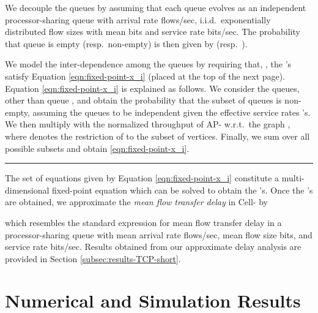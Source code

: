 \documentclass[10pt,a4paper,journal]{IEEEtran}
\theoremstyle{definition}
\theoremstyle{remark}
\theoremstyle{plain}
\begin{document}
We decouple the queues by assuming that each queue  evolves as an independent processor-sharing queue with arrival rate  flows/sec, i.i.d.~exponentially distributed flow sizes with mean  bits and service rate  bits/sec. The probability that queue  is empty (resp.~non-empty) is then given by  (resp.~).

We model the inter-dependence among the queues by requiring that, , the 's satisfy Equation \eqref{eqn:fixed-point-x_i} (placed at the top of the next page). Equation \eqref{eqn:fixed-point-x_i} is explained as follows. We consider the queues, other than queue , and obtain the probability  that the subset  of queues is non-empty, assuming the queues to be independent given the effective service rates 's. We then multiply  with the normalized throughput of AP- w.r.t.~the graph , where  denotes the restriction of  to the subset  of vertices. Finally, we sum over all possible subsets  and obtain \eqref{eqn:fixed-point-x_i}. 


\begin{figure*}[tbh]
\begin{footnotesize}

\end{footnotesize}
\rule{173mm}{.3mm}
\end{figure*}


The set of equations given by Equation \eqref{eqn:fixed-point-x_i} constitute a multi-dimensional fixed-point equation which can be solved to obtain the 's. Once the 's are obtained, we approximate the \textit{mean flow transfer delay}  in Cell- by 
 
which resembles the standard expression for mean flow transfer delay in a processor-sharing queue with mean arrival rate  flows/sec, mean flow size  bits, and service rate  bits/sec. Results obtained from our approximate delay analysis are provided in Section \ref{subsec:results-TCP-short}.



\section{Numerical and Simulation Results}
\label{sec:results}
\end{document}
